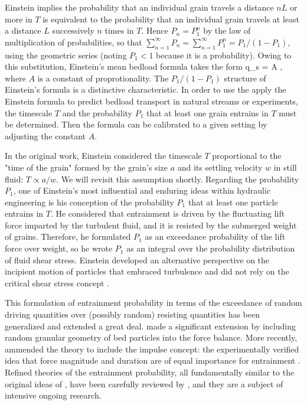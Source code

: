 Einstein implies the probability that an individual grain travels a distance $nL$ or more in $T$ is equivalent to the probability that an individual grain travels at least a distance $L$ successively $n$ times in $T$. 
Hence $P_n = P_1^n$ by the law of multiplication of probabilities, so that $\sum_{n=1}^\infty P_n = \sum_{n=1}^\infty P_1^n = P_1/(1-P_1)$, using the geometric series (noting $P_1 < 1$ because it is a probability). 
Owing to this substitution, Einstein's mean bedload formula takes the form 
\be  \bra q_s \ket = A , \label{eq:einstein2} \ee
where $A$ is a constant of proprotionality.  
The $P_1/(1-P_1)$ structure of Einstein's formula is a distinctive characteristic. 
In order to use the apply the Einstein formula to predict bedload transport in natural streams or experiments, the timescale $T$ and the probability $P_1$ that at least one grain entrains in $T$ must be determined. 
Then the formula can be calibrated to a given setting by adjusting the constant $A$.  

In the original work, Einstein considered the timescale $T$ proportional to the "time of the grain" formed by the grain's size $a$ and its settling velocity $w$ in still fluid: $T \propto a/w$. 
We will revisit this assumption shortly. 
Regarding the probability $P_1$, one of Einstein's most influential and enduring ideas within hydraulic engineering is his conception of the probability $P_1$ that at least one particle entrains in $T$. 
He considered that entrainment is driven by the fluctuating lift force imparted by the turbulent fluid, and it is resisted by the submerged weight of grains. 
Therefore, he formulated $P_1$ as an exceedance probability of the lift force over weight, so he wrote $P_1$ as an integral over the probability distribution of fluid shear stress. 
Einstein developed an alternative perspective on the incipient motion of particles that embraced turbulence and did not rely on the critical shear stress concept \citep[e.g.][]{Shields1936}.

This formulation of entrainment probability in terms of the exceedance of random driving quantities over (possibly random) resisting quantities has been generalized and extended a great deal. 
\citet{Paintal1971} made a significant extension by including random granular geometry of bed particles into the force balance. 
More recently, \citet{Tregnaghi2012} ammended the theory to include the impulse concept: the experimentally verified idea that force magnitude and duration are of equal importance for entrainment \citep[e.g.][]{Diplas2008, Celik2014}. 
Refined theories of the entrainment probability, all fundamentally similar to the original ideas of \citet{Einstein1950}, have been carefully reviewed by \citet{Dey2008, Dey2018}, and they are a subject of intensive ongoing research.  

